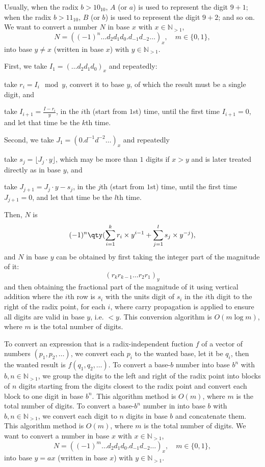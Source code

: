 \documentclass[a4paper,12pt]{article}
\begin{document}
Usually, when the radix $b>10_{10}$, $A$ (or $a$) is used to represent the digit $9+1$; when the radix $b>11_{10}$, $B$ (or $b$) is used to represent the digit $9+2$; and so on.
We want to convert a number $N$ in base $x$ with $x\in\mathbb{N}_{>1}$,
\[N=((-1)^n\ldots d_2d_1d_0.d_{-1}d_{-2}\ldots)_x,\quad m\in\{0,1\},\]
into base $y\neq x$ (written in base $x$) with $y\in\mathbb{N}_{>1}$.
\ben
\item First, we take $I_1=(\ldots d_2d_1d_0)_x$ and repeatedly:
\ben
\item take $r_i=I_i\mod y$, convert it to base $y$, of which the result must be a single digit, and
\item take $I_{i+1}=\frac{I-r_i}{y}$,
\een
in the $i$th (start from $1$st) time, until the first time $I_{i+1}=0$, and let that time be the $k$th time.
\item Second, we take $J_1=(0.d^{-1}d^{-2}\ldots)_x$ and repeatedly
\ben
\item take $s_j=\lfloor J_j\cdot y\rfloor$, which may be more than $1$ digits if $x>y$ and is later treated directly as in base $y$, and
\item take $J_{j+1}=J_j\cdot y-s_j$,
\een
in the $j$th (start from $1$st) time, until the first time $J_{j+1}=0$, and let that time be the $l$th time.
\item Then, $N$ is
\[(-1)^n\qty(\sum_{i=1}^kr_i\times y^{i-1}+\sum_{j=1}^ls_j\times y^{-j}),\]
and $N$ in base $y$ can be obtained by first taking the integer part of the magnitude of it:
\[(r_kr_{k-1}\ldots r_2r_1)_y\]
and then obtaining the fractional part of the magnitude of it using vertical addition where the $i$th row is $s_i$ with the units digit of $s_i$ in the $i$th digit to the right of the radix point, for each $i$, where carry propagation is applied to ensure all digits are valid in base $y$, i.e. $<y$.
\een
This conversion algorithm is $O(m\log m)$, where $m$ is the total number of digits.

To convert an expression that is a radix-independent fuction $f$ of a vector of numbers $(p_1,p_2,\ldots)$, we convert each $p_i$ to the wanted base, let it be $q_i$, then the wanted result is $f(q_1,q_2,\ldots)$.
To convert a base-$b$ number into base $b^n$ with $b,n\in\mathbb{N}_{>1}$, we group the digits to the left and right of the radix point into blocks of $n$ digits starting from the digits closest to the radix point and convert each block to one digit in base $b^n$. This algorithm method is $O(m)$, where $m$ is the total number of digits.
To convert a base-$b^n$ number in into base $b$ with $b,n\in\mathbb{N}_{>1}$, we convert each digit to $n$ digits in base $b$ and concatenate them. This algorithm method is $O(m)$, where $m$ is the total number of digits.
We want to convert a number in base $x$ with $x\in\mathbb{N}_{>1}$,
\[N=((-1)^m\ldots d_2d_1d_0.d_{-1}d_{-2}\ldots)_x,\quad m\in\{0,1\},\]
into base $y=ax$ (written in base $x$) with $y\in\mathbb{N}_{>1}$.
\end{document}
